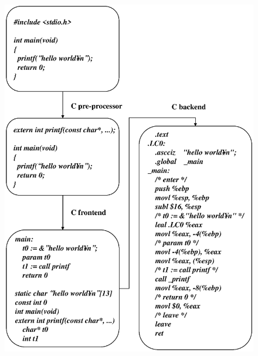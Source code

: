 \label{front_back_e000}

\begin{figure}[htbp]
\begin{center}
\begin{latexonly}
\includegraphics[width=1.0\linewidth,height=1.2\linewidth]{front_back_e.eps}
\end{latexonly}
\begin{htmlonly}

\end{htmlonly}
\end{center}
\end{figure}
